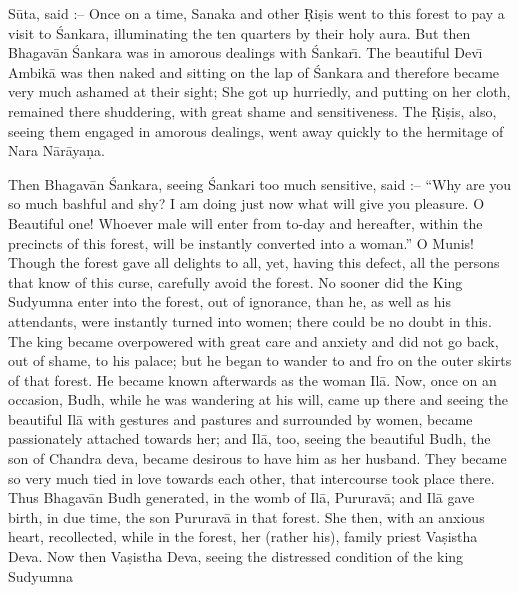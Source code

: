 S\=uta, said :-- Once on a time, Sanaka and other \d{R}i\d{s}is went to this forest to pay a visit to \'Sankara, illuminating the ten quarters by their holy aura. But then Bhagav\=an \'Sankara was in amorous dealings with \'Sankar\={\i}. The beautiful Dev\={\i} Ambik\=a was then naked and sitting on the lap of \'Sankara and therefore became very much ashamed at their sight; She got up hurriedly, and putting on her cloth, remained there shuddering, with great shame and sensitiveness. The \d{R}i\d{s}is, also, seeing them engaged in amorous dealings, went away quickly to the hermitage of Nara N\=ar\=aya\d{n}a.

Then Bhagav\=an \'Sankara, seeing \'Sankari too much sensitive, said :-- ``Why are you so much bashful and shy? I am doing just now what will give you pleasure. O Beautiful one! Whoever male will enter from to-day and hereafter, within the precincts of this forest, will be instantly converted into a woman.'' O Munis! Though the forest gave all delights to all, yet, having this defect, all the persons that know of this curse, carefully avoid the forest. No sooner did the King Sudyumna enter into the forest, out of ignorance, than he, as well as his attendants, were instantly turned into women; there could be no doubt in this. The king became overpowered with great care and anxiety and did not go back, out of shame, to his palace; but he began to wander to and fro on the outer skirts of that forest. He became known afterwards as the woman Il\=a. Now, once on an occasion, Budh, while he was wandering at his will, came up there and seeing the beautiful Il\=a with gestures and pastures and surrounded by women, became passionately attached towards her; and Il\=a, too, seeing the beautiful Budh, the son of Chandra deva, became desirous to have him as her husband. They became so very much tied in love towards each other, that intercourse took place there. Thus Bhagav\=an Budh generated, in the womb of Il\=a, Pururav\=a; and Il\=a gave birth, in due time, the son Pururav\=a in that forest. She then, with an anxious heart, recollected, while in the forest, her (rather his), family priest Va\d{s}istha Deva. Now then Va\d{s}istha Deva, seeing the distressed condition of the king Sudyumna

